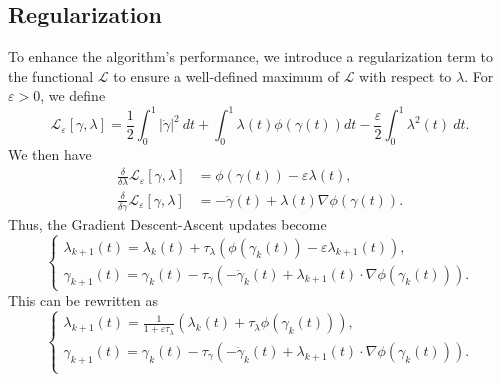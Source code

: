 \documentclass[12pt]{amsart}
\theoremstyle{definition}
\theoremstyle{remark}
\numberwithin{equation}{section}
\numberwithin{equation}{section}
\begin{document}
\subsection{Regularization}
To enhance the algorithm's performance,  we  introduce a regularization term to the functional  $\mathcal{L}$ to ensure a well-defined maximum of $\mathcal{L}$ with respect to $\lambda$. For $\varepsilon>0$, we define
\[\mathcal{L}_{\varepsilon}[\gamma,\lambda] = \frac{1}{2}\int_0^1 |\dot{\gamma}|^2~dt + \int_0^1\lambda(t)\phi(\gamma(t))dt -\frac{\varepsilon}{2}\int_0^1\lambda^2(t)~dt.\]
We then have  
\begin{align*}
  \frac{\delta}{\delta\lambda} \mathcal{L}_{\varepsilon}[\gamma,\lambda] & = \phi(\gamma(t)) - \varepsilon\lambda(t), \\
    \frac{\delta}{\delta\gamma}\mathcal{L}_{\varepsilon}[\gamma,\lambda] & = -\ddot{\gamma}(t)+\lambda(t)\nabla\phi(\gamma(t)).
\end{align*}
Thus, the Gradient Descent-Ascent updates become
\[\begin{cases}
   \lambda_{k+1}(t) = \lambda_k(t) + \tau_{\lambda}(\phi(\gamma_{k}(t))-\varepsilon\lambda_{k+1}(t)),\\
    \gamma_{k+1}(t) = \gamma_k(t)-\tau_{\gamma}(-\ddot{\gamma}_k(t)+\lambda_{k+1}(t)\cdot \nabla\phi(\gamma_k(t))).
\end{cases}\]
This can be rewritten as
\[\begin{cases}
    \lambda_{k+1}(t) = \frac{1}{1+\varepsilon\tau_{\lambda}}(\lambda_k(t)+\tau_{\lambda}\phi(\gamma_{k}(t))),\\
    \gamma_{k+1}(t) = \gamma_k(t)-\tau_{\gamma}(-\ddot{\gamma}_k(t)+\lambda_{k+1}(t)\cdot \nabla\phi(\gamma_k(t))).\\
\end{cases}\]
\end{document}
